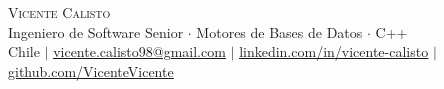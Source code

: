 %



\begin{center}
    {\Huge \scshape Vicente Calisto} \\ \vspace{3pt}
    \small {}
              {Ingeniero de Software Senior $\cdot$ Motores de Bases de Datos $\cdot$ C++}
    \\ \vspace{3pt}
    Chile $|$
    \href{mailto:vicente.calisto98@gmail.com}{\underline{vicente.calisto98@gmail.com}} $|$
    \href{https://linkedin.com/in/vicente-calisto}{\underline{linkedin.com/in/vicente-calisto}} $|$
    \href{https://github.com/VicenteVicente}{\underline{github.com/VicenteVicente}}
\end{center}

\section{}
  \resumeSubHeadingListStart

